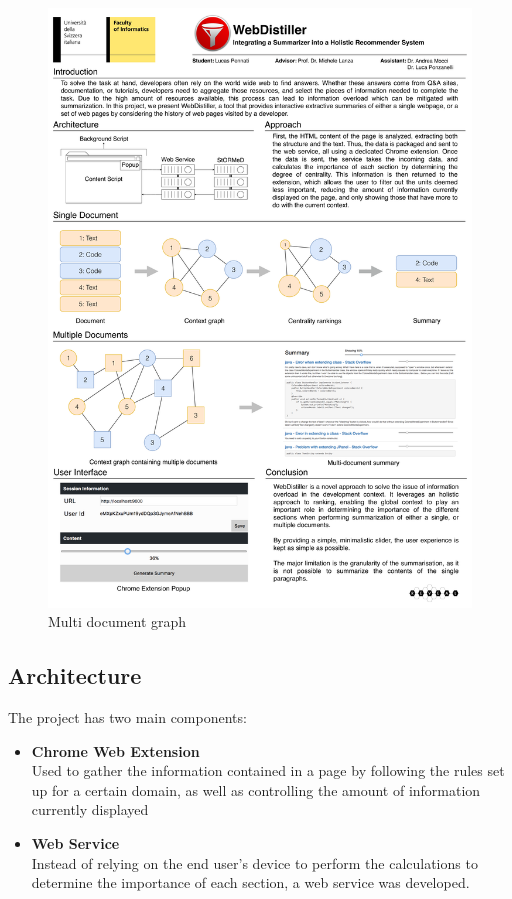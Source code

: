 \begin{figure}[H]
\centering
\includegraphics[scale=0.2]{Figures/mdGraphs}
\caption{Multi document graph}
\label{fig:multipleDocumentGraph}
\end{figure} 


\subsection{Architecture}\label{sec:architecture}
The project has two main components:
\begin{itemize}
\item \textbf{Chrome Web Extension}\\
Used to gather the information contained in a page by following the rules set up for a certain domain, as well as controlling the amount of information currently displayed
\item \textbf{Web Service}\\
Instead of relying on the end user's device to perform the calculations to determine the importance of each section, a web service was developed.
\end{itemize}


